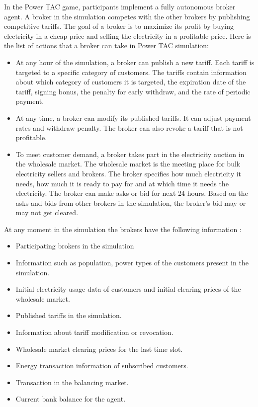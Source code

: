 In the Power TAC game, participants implement a fully autonomous broker agent. A broker in the simulation competes with the other brokers by publishing competitive tariffs. The goal of a broker is to maximize its profit by buying electricity in a cheap price and selling the electricity in a profitable price. Here is the list of actions that a broker can take in Power TAC simulation:
\begin{itemize}  
\item At any hour of the simulation, a broker can publish a new tariff. Each tariff is targeted to a specific category of customers. The tariffs contain information about which category of customers it is targeted, the expiration date of the tariff, signing bonus, the penalty for early withdraw, and the rate of periodic payment. 
\item At any time, a broker can modify its published tariffs. It can adjust payment rates and withdraw penalty. The broker can also revoke a tariff that is not profitable.
\item To meet customer demand, a broker takes part in the electricity auction in the wholesale market. The wholesale market is the meeting place for bulk electricity sellers and brokers. The broker specifies how much electricity it needs, how much it is ready to pay for and at which time it needs the electricity. The broker can make asks or bid for next 24 hours. Based on the asks and bids from other brokers in the simulation, the broker's bid may or may not get cleared. 
\end{itemize}

At any moment in the simulation the brokers have the following information : 
\begin{itemize}  
\item Participating brokers in the simulation 
\item Information such as population, power types of the customers present in the simulation.
\item Initial electricity usage data of customers and initial clearing prices of the wholesale market.
\item Published tariffs in the simulation.
\item Information about tariff modification or revocation.
\item Wholesale market clearing prices for the last time slot.
\item Energy transaction information of subscribed customers.
\item Transaction in the balancing market.
\item Current bank balance for the agent.
\end{itemize}


